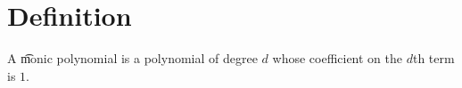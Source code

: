 

\section*{Definition}

A \t{monic polynomial} is a polynomial of degree $d$ whose coefficient on the $d$th term is $1$.

\blankpage